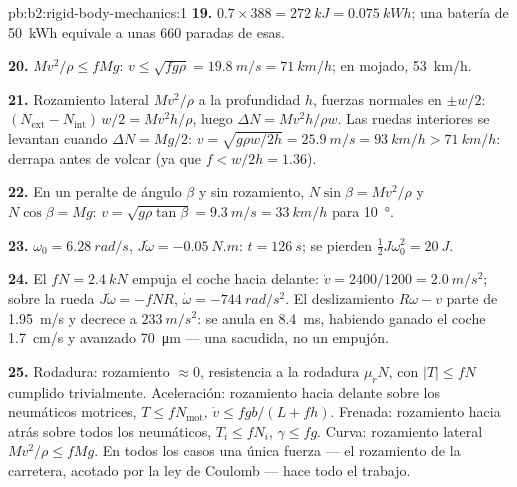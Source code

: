 \begin{solution}{pb:b2:rigid-body-mechanics:1}
\textbf{19.} $0.7 \times 388 = \qty{272}{kJ} = \qty{0.075}{kWh}$; una batería de \qty{50}{kWh}
equivale a unas $660$ paradas de esas.

\textbf{20.} $Mv^2/\rho \le fMg$: $v \le \sqrt{fg\rho} = \qty{19.8}{m/s} =
\qty{71}{km/h}$; en mojado, \qty{53}{km/h}.

\textbf{21.} Rozamiento lateral $Mv^2/\rho$ a la profundidad $h$, fuerzas
normales en $\pm w/2$: $(N_{\text{ext}} - N_{\text{int}})\,w/2 = Mv^2h/\rho$, luego $\Delta N =
Mv^2h/\rho w$. Las ruedas interiores se levantan cuando $\Delta N = Mg/2$: $v = \sqrt{g\rho w/2h} =
\qty{25.9}{m/s} = \qty{93}{km/h} > \qty{71}{km/h}$: derrapa antes de volcar (ya que $f <
w/2h = 1.36$).

\textbf{22.} En un peralte de ángulo $\beta$ y sin rozamiento, $N\sin\beta =
Mv^2/\rho$ y $N\cos\beta = Mg$: $v = \sqrt{g\rho\tan\beta} = \qty{9.3}{m/s} =
\qty{33}{km/h}$ para \qty{10}{\degree}.

\textbf{23.} $\omega_0 = \qty{6.28}{rad/s}$, $J\dot\omega = \qty{-0.05}{N.m}$: $t =
\qty{126}{s}$; se pierden $\tfrac12J\omega_0^2 = \qty{20}{J}$.

\textbf{24.} El  $fN = \qty{2.4}{kN}$ empuja el coche hacia
delante: $\dot v = 2400/1200 = \qty{2.0}{m/s^2}$; sobre la rueda $J\dot\omega = -fNR$,
$\dot\omega = \qty{-744}{rad/s^2}$. El deslizamiento $R\omega - v$ parte de \qty{1.95}{m/s}
y decrece a $\qty{233}{m/s^2}$: se anula en \qty{8.4}{ms}, habiendo ganado el
coche \qty{1.7}{cm/s} y avanzado \qty{70}{\micro m} --- una sacudida, no un empujón.

\textbf{25.} Rodadura: rozamiento $\approx 0$, resistencia a la rodadura
$\mu_rN$, con $|T| \le fN$ cumplido trivialmente. Aceleración: rozamiento
hacia delante sobre los neumáticos motrices, $T \le fN_{\text{mot}}$, $\dot v \le fgb/(L + fh)$. Frenada:
rozamiento hacia atrás sobre todos los neumáticos, $T_i \le fN_i$, $\gamma \le fg$.
Curva: rozamiento lateral $Mv^2/\rho \le fMg$. En todos los casos una única
fuerza --- el rozamiento de la carretera, acotado por la ley de Coulomb ---
hace todo el trabajo.
\end{solution}

